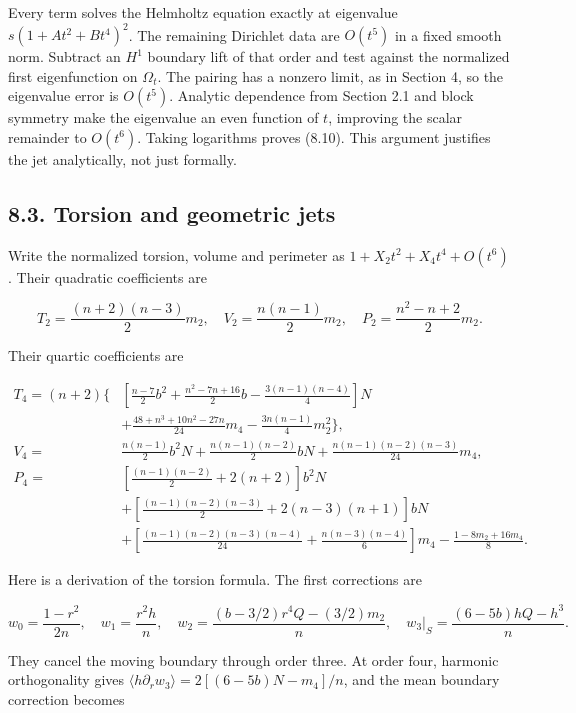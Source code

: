 \documentclass[11pt]{article}
\begin{document}
Every term solves the Helmholtz equation exactly at eigenvalue
\(s(1+At^2+Bt^4)^2\). The remaining Dirichlet data are \(O(t^5)\) in a
fixed smooth norm. Subtract an \(H^1\) boundary lift of that order and
test against the normalized first eigenfunction on \(\Omega_t\). The
pairing has a nonzero limit, as in Section 4, so the eigenvalue error is
\(O(t^5)\). Analytic dependence from Section 2.1 and block symmetry make
the eigenvalue an even function of \(t\), improving the scalar remainder
to \(O(t^6)\). Taking logarithms proves (8.10). This argument justifies
the jet analytically, not just formally.

\subsection{8.3. Torsion and geometric
jets}\label{torsion-and-geometric-jets}

Write the normalized torsion, volume and perimeter as
\(1+X_2t^2+X_4t^4+O(t^6)\). Their quadratic coefficients are

\[
T_2=\frac{(n+2)(n-3)}2m_2,\quad
V_2=\frac{n(n-1)}2m_2,\quad
P_2=\frac{n^2-n+2}2m_2.
\tag{8.13}
\]

Their quartic coefficients are

\[
\begin{aligned}
T_4=(n+2)\bigg\{&
\left[\frac{n-7}2b^2+\frac{n^2-7n+16}2b
-\frac{3(n-1)(n-4)}4\right]N\\
&+\frac{48+n^3+10n^2-27n}{24}m_4-\frac{3n(n-1)}4m_2^2\bigg\},\\
V_4={}&\frac{n(n-1)}2b^2N+\frac{n(n-1)(n-2)}2bN
+\frac{n(n-1)(n-2)(n-3)}{24}m_4,\\
P_4={}&\left[\frac{(n-1)(n-2)}2+2(n+2)\right]b^2N\\
&+\left[\frac{(n-1)(n-2)(n-3)}2+2(n-3)(n+1)\right]bN\\
&+\left[\frac{(n-1)(n-2)(n-3)(n-4)}{24}
+\frac{n(n-3)(n-4)}6\right]m_4
-\frac{1-8m_2+16m_4}{8}.
\end{aligned}
\tag{8.14}
\]

Here is a derivation of the torsion formula. The first corrections are

\[
w_0=\frac{1-r^2}{2n},\quad w_1=\frac{r^2h}{n},\quad
w_2=\frac{(b-3/2)r^4Q-(3/2)m_2}{n},
\quad
w_3|_S=\frac{(6-5b)hQ-h^3}{n}.
\tag{8.15}
\]

They cancel the moving boundary through order three. At order four,
harmonic orthogonality gives
\(\langle h\partial_rw_3\rangle=2[(6-5b)N-m_4]/n\), and the mean
boundary correction becomes
\end{document}
